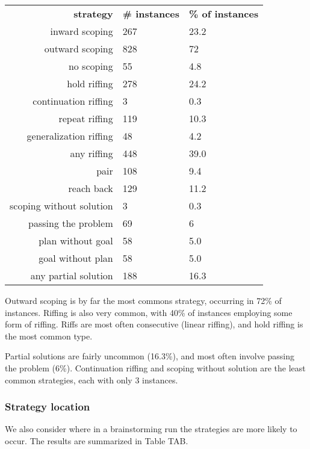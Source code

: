 \begin{table}
    \begin{tabular}{r | l l}
        \textbf{strategy} & \textbf{\# instances} & \textbf{\% of instances} \\
        inward scoping & 267 & 23.2 \\
        outward scoping & 828 & 72 \\
        no scoping & 55 & 4.8 \\
        \hline \hline
        hold riffing & 278 & 24.2 \\
        continuation riffing & 3 & 0.3 \\
        repeat riffing & 119 & 10.3 \\
        generalization riffing & 48 & 4.2 \\
        \hline
        any riffing & 448 & 39.0 \\
        pair & 108 & 9.4 \\
        reach back & 129 & 11.2 \\
        \hline \hline
        scoping without solution & 3 & 0.3 \\
        passing the problem & 69 & 6 \\
        plan without goal & 58 & 5.0 \\
        goal without plan & 58 & 5.0 \\ 
        \hline
        any partial solution & 188 & 16.3 \\
    \end{tabular}
\end{table}

Outward scoping is by far the most commons strategy, occurring in 72\% of instances. Riffing is also very common, with 40\% of instances employing some form of riffing. Riffs are most often consecutive (linear riffing), and hold riffing is the most common type.

Partial solutions are fairly uncommon (16.3\%), and most often involve passing the problem (6\%). Continuation riffing and scoping without solution are the least common strategies, each with only 3 instances.

\subsubsection{Strategy location}

We also consider where in a brainstorming run the strategies are more likely to occur. The results are summarized in Table TAB.

